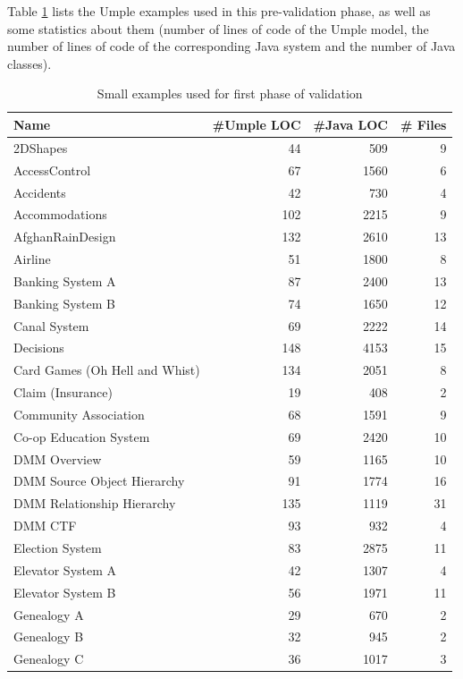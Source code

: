 Table \ref{table:umpleexamples} lists the Umple examples used in this pre-validation phase, as well as  some statistics about them (number of lines of code of the Umple model, the number of lines of code of the corresponding Java system and the number of Java classes).

\begin{table}
\caption{Small examples used for first phase of validation}
\label{table:umpleexamples}
\centering
\begin{tabular}{p{6cm}|rrr}
\toprule
\rowcolor[HTML]{BBDAFF}
\textbf{Name} & \textbf{\#Umple LOC} & \textbf{\#Java LOC} & \textbf{\#  Files} \\ \midrule
2DShapes & 44 & 509 & 9\\ \hline
AccessControl & 67 & 1560 & 6\\ \hline
Accidents & 42 & 730 & 4\\ \hline
Accommodations & 102 & 2215 & 9\\ \hline
AfghanRainDesign & 132 & 2610 & 13\\ \hline
Airline & 51 & 1800 & 8\\ \hline
Banking System A & 87 & 2400 & 13\\ \hline
Banking System B & 74 & 1650 & 12\\ \hline
Canal System & 69 & 2222 & 14\\ \hline
Decisions & 148 & 4153 & 15\\ \hline
Card Games (Oh Hell and Whist) & 134 & 2051 & 8\\ \hline
Claim (Insurance) & 19 & 408 & 2\\ \hline
Community Association & 68 & 1591 & 9\\ \hline
Co-op Education System & 69 & 2420 & 10\\ \hline
DMM Overview & 59 & 1165 & 10\\ \hline
DMM Source Object Hierarchy & 91 & 1774 & 16\\ \hline
DMM Relationship Hierarchy & 135 & 1119 & 31\\ \hline
DMM CTF & 93 & 932 & 4\\ \hline
Election System & 83 & 2875 & 11\\ \hline
Elevator System A & 42 & 1307 & 4\\ \hline
Elevator System B & 56 & 1971 &11\\ \hline
Genealogy A & 29 & 670 & 2\\ \hline
Genealogy B & 32 & 945 & 2\\ \hline
Genealogy C & 36 & 1017 & 3\\ \hline

\end{tabular}
\end{table}
